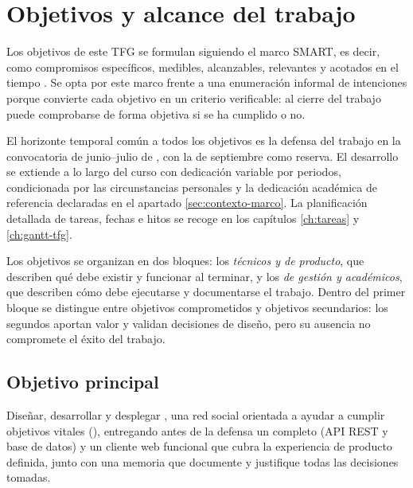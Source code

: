 
\chapter{Objetivos y alcance del trabajo}
\label{ch:objetivos}

Los objetivos de este \ac{TFG} se formulan siguiendo el marco \ac{SMART}, es decir, como compromisos específicos, medibles, alcanzables, relevantes y acotados en el tiempo \parencite{doran-smart}.
Se opta por este marco frente a una enumeración informal de intenciones porque convierte cada objetivo en un criterio verificable: al cierre del trabajo puede comprobarse de forma objetiva si se ha cumplido o no.

El horizonte temporal común a todos los objetivos es la defensa del trabajo en la convocatoria de junio--julio de \thesisYear, con la de septiembre como reserva.
El desarrollo se extiende a lo largo del curso \thesisCourse{} con dedicación variable por periodos, condicionada por las circunstancias personales y la dedicación académica de referencia declaradas en el apartado \ref{sec:contexto-marco}.
La planificación detallada de tareas, fechas e hitos se recoge en los capítulos \ref{ch:tareas} y \ref{ch:gantt-tfg}.

Los objetivos se organizan en dos bloques: los \emph{técnicos y de producto}, que describen qué debe existir y funcionar al terminar, y los \emph{de gestión y académicos}, que describen cómo debe ejecutarse y documentarse el trabajo.
Dentro del primer bloque se distingue entre objetivos comprometidos y objetivos secundarios: los segundos aportan valor y validan decisiones de diseño, pero su ausencia no compromete el éxito del trabajo.

\section{Objetivo principal}
\label{sec:objetivo-principal}

Diseñar, desarrollar y desplegar \bukit, una red social orientada a ayudar a cumplir objetivos vitales (), entregando antes de la defensa un  completo (\ac{API} \ac{REST} y base de datos) y un cliente web funcional que cubra la experiencia de producto definida, junto con una memoria que documente y justifique todas las decisiones tomadas.

